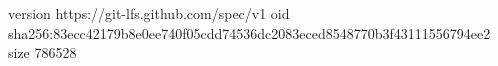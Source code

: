 version https://git-lfs.github.com/spec/v1
oid sha256:83ecc42179b8e0ee740f05cdd74536dc2083eced8548770b3f43111556794ee2
size 786528
